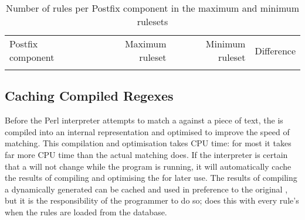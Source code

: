 

\begin{table}[thbp]
    \caption{Number of rules per Postfix component in the maximum and
    minimum rulesets}
    \empty{}\label{Number of rules per Postfix component in the maximum and
    minimum rulesets}
    \centering{}
    \begin{tabular}{lrrr}
        \tabletopline{}%
        Postfix component & Maximum ruleset & Minimum ruleset & Difference \\
        \tablemiddleline{}%
        
        \tablebottomline{}%
    \end{tabular}
\end{table}

\FloatBarrier{}

\subsection{Caching Compiled Regexes}

\label{Caching compiled regexes}

Before the Perl interpreter attempts to match a  against a
piece of text, the  is compiled into an internal
representation and optimised to improve the speed of matching.  This
compilation and optimisation takes CPU time: for most \regexes{} it takes
far more CPU time than the actual matching does.  If the interpreter is
certain that a  will not change while the program is
running, it will automatically cache the results of compiling and
optimising the  for later use.  The results of compiling a
dynamically generated  can be cached and used in preference
to the original , but it is the responsibility of the
programmer to do so; \parsername{} does this with every rule's
 when the rules are loaded from the database.

